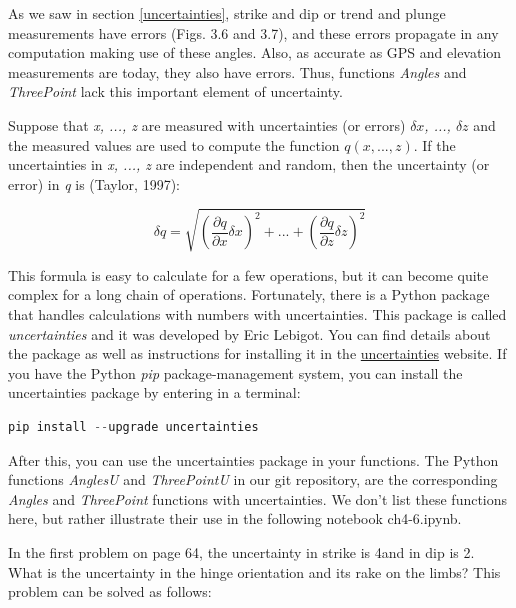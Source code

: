 \documentclass[a4paper , 12pt]{book}
\begin{document}
As we saw in section \ref{uncertainties}, strike and dip or trend and plunge measurements have errors (Figs. 3.6 and 3.7), and these errors  propagate in any computation making use of these angles. Also, as accurate as GPS and elevation measurements are today, they also have errors. Thus, functions \textit{Angles} and \textit{ThreePoint} lack this important element of uncertainty.

Suppose that \textit{x, ..., z} are measured with uncertainties (or errors) \textit{$\delta x$, ..., $\delta z$} and the measured values are used to compute the function $q(x,...,z)$. If the uncertainties in \textit{x, ..., z} are independent and random, then the uncertainty (or error) in \textit{q} is (Taylor, 1997):

\begin{equation}
    \delta q=\sqrt{\left(\frac{\partial q}{\partial x}\delta x \right)^2+...+\left(\frac{\partial q}{\partial z}\delta z \right)^2}\tag{4.16}
\end{equation}

This formula is easy to calculate for a few operations, but it can become quite complex for a long chain of operations. Fortunately, there is a Python package that handles calculations with numbers with uncertainties. This package is called \textit{uncertainties} and it was developed by Eric Lebigot. You can find details about the package as well as instructions for installing it in the \href{https://pythonhosted.org/uncertainties/}{uncertainties} website. If you have the Python \textit{pip} package-management system, you can install the uncertainties package by entering in a terminal:

\begin{center}
\begin{lstlisting}[language=Python, frame=single]
pip install --upgrade uncertainties
\end{lstlisting}
\end{center}

After this, you can use the uncertainties package in your functions. The Python functions \textit{AnglesU} and \textit{ThreePointU} in our git repository, are the corresponding \textit{Angles} and \textit{ThreePoint} functions with uncertainties. We don't list these functions here, but rather illustrate their use in the following notebook ch4-6.ipynb.

In the first problem on page 64, the uncertainty in strike is 4\degree and in dip is 2\degree. What is the uncertainty in the hinge orientation and its rake on the limbs? This problem can be solved as follows:
\end{document}
